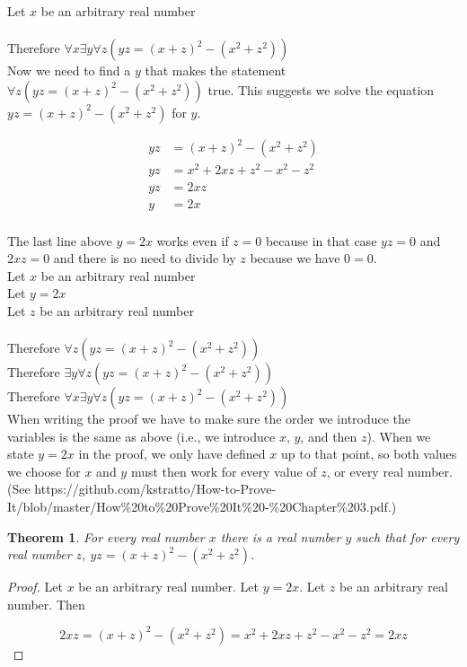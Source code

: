 \documentclass{article}
\newcommand{\n}{ \noindent }
\newtheorem*{theorem}{Theorem}  %
\begin{document}
\n Let $x$ be an arbitrary real number \\
\indent [proof of $\exists y \forall z (yz = (x + z)^2 - (x^2 + z^2))$] \\
\n Therefore $\forall x \exists y \forall z (yz = (x + z)^2 - (x^2 + z^2))$ \\

\n Now we need to find a $y$ that makes the statement $\forall z (yz = (x + z)^2 - (x^2 + z^2))$ true. This suggests we solve the equation $yz = (x + z)^2 - (x^2 + z^2)$ for $y$.

\begin{align*}
yz &= (x + z)^2 - (x^2 + z^2) \\
yz &= x^2 + 2xz + z^2 - x^2 - z^2 \\
yz &= 2xz \\
y &= 2x \\
\end{align*}

\n The last line above $y = 2x$ works even if $z = 0$ because in that case $yz = 0$ and $2xz = 0$ and there is no need to divide by $z$ because we have $0 = 0$. \\


\n Let $x$ be an arbitrary real number \\
\indent Let $y = 2x$ \\
\indent \indent Let $z$ be an arbitrary real number \\
\indent \indent \indent [proof of $yz = (x + z)^2 - (x^2 + z^2)$] \\
\indent \indent Therefore $\forall z (yz = (x + z)^2 - (x^2 + z^2))$ \\
\indent Therefore $\exists y \forall z (yz = (x + z)^2 - (x^2 + z^2))$ \\
\n Therefore $\forall x \exists y \forall z (yz = (x + z)^2 - (x^2 + z^2))$ \\

\n When writing the proof we have to make sure the order we introduce the variables is the same as above (i.e., we introduce $x$, $y$, and then $z$). When we state $y = 2x$ in the proof, we only have defined $x$ up to that point, so both values we choose for $x$ and $y$ must then work for every value of $z$, or every real number. (See https://github.com/kstratto/How-to-Prove-It/blob/master/How\%20to\%20Prove\%20It\%20-\%20Chapter\%203.pdf.)

\begin{theorem} For every real number $x$ there is a real number $y$ such that for every real number $z$, $yz = (x + z)^2 - (x^2 + z^2)$.
\end{theorem}
\begin{proof}
Let $x$ be an arbitrary real number. Let $y = 2x$. Let $z$ be an arbitrary real number. Then

\begin{equation*}
2xz = (x + z)^2 - (x^2 + z^2) = x^2 + 2xz + z^2 - x^2 - z^2 = 2xz
\end{equation*}

\end{proof}
\end{document}
